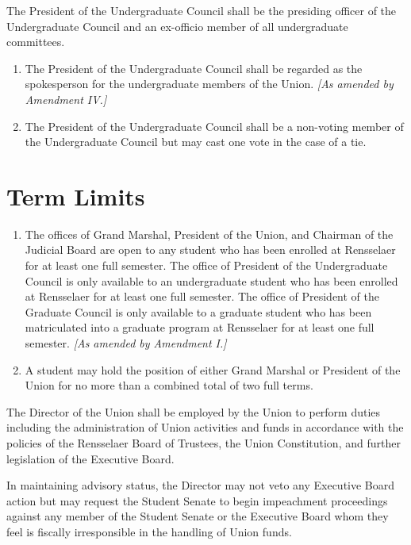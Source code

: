 \documentclass{uniondoc}
\begin{document}
The President of the Undergraduate Council shall be the presiding officer of the Undergraduate Council and an ex-officio member of all undergraduate committees.

\begin{enumerate}
\item The President of the Undergraduate Council shall be regarded as the spokesperson for the undergraduate members of the Union. \textit{[As amended by Amendment IV.]}
\item The President of the Undergraduate Council shall be a non-voting member of the Undergraduate Council but may cast one vote in the case of a tie.
\end{enumerate}

\section{Term Limits}

\begin{enumerate}
\item The offices of Grand Marshal, President of the Union, and Chairman of the Judicial Board are open to any student who has been enrolled at Rensselaer for at least one full semester. The office of President of the Undergraduate Council is only available to an undergraduate student who has been enrolled at Rensselaer for at least one full semester. The office of President of the Graduate Council is only available to a graduate student who has been matriculated into a graduate program at Rensselaer for at least one full semester. \textit{[As amended by Amendment I.]}
\item A student may hold the position of either Grand Marshal or President of the Union for no more than a combined total of two full terms.
\end{enumerate}


The Director of the Union shall be employed by the Union to perform duties including the administration of Union activities and funds in accordance with the policies of the Rensselaer Board of Trustees, the Union Constitution, and further legislation of the Executive Board.

In maintaining advisory status, the Director may not veto any Executive Board action but may request the Student Senate to begin impeachment proceedings against any member of the Student Senate or the Executive Board whom they feel is fiscally irresponsible in the handling of Union funds.
\end{document}

